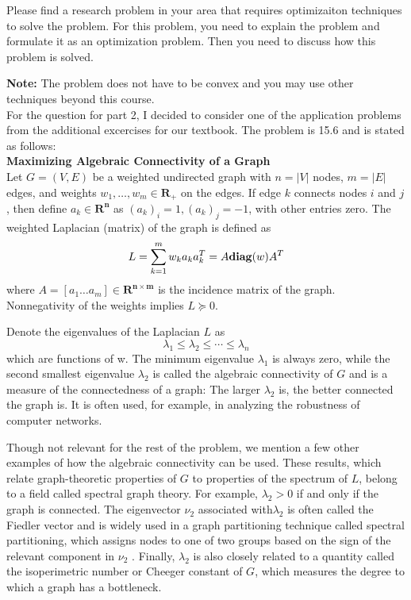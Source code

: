 Please find a research problem in your area that requires optimizaiton
techniques to solve the problem. For this problem, you need to explain
the problem and formulate it as an optimization problem. Then you need
to discuss how this problem is solved.

\textbf{Note:} The problem does not have to be convex and you may
use other techniques beyond this course.\\

For the question for part 2, I decided to consider one of the application problems
from the additional excercises for our textbook.  The problem is 15.6 and is stated
as follows:\\

\textbf{Maximizing Algebraic Connectivity of a Graph}\\

Let $G = (V, E)$ be a weighted undirected graph with $n = \vert V \vert$ nodes,
$m = \vert E \vert$ edges, and weights $w_{1}, \ldots, w_{m} \in \mathbf{R_{+}}$ on
the edges. If edge $k$ connects nodes $i$ and $j$, then define $a_{k} \in \mathbf{R^{n}}$
as $(a_{k})_{i} = 1, (a_{k})_{j} = -1$, with other entries zero.  The weighted Laplacian
(matrix) of the graph is defined as
\[
L = \sum_{k = 1}^{m} w_{k} a_{k} a_{k}^{T} = A \mbox{\textbf{diag}}(w)A^{T}
\]
where $A = [ a_{1} \ldots a_{m} ] \in \mathbf{R^{n \times m}}$ is the incidence matrix of the
graph. Nonnegativity of the weights implies $L \succeq 0$.

Denote the eigenvalues of the Laplacian $L$ as
\[
\lambda_{1} \leq \lambda_{2} \leq \cdots \leq \lambda_{n}
\]
which are functions of w. The minimum eigenvalue $\lambda_{1}$ is always zero, while the second smallest
eigenvalue $\lambda_{2}$ is called the algebraic connectivity of $G$ and is a measure of the connectedness of
a graph: The larger $\lambda_{2}$ is, the better connected the graph is. It is often used, for example, in
analyzing the robustness of computer networks.

Though not relevant for the rest of the problem, we mention a few other examples of how the
algebraic connectivity can be used. These results, which relate graph-theoretic properties of $G$
to properties of the spectrum of $L$, belong to a field called spectral graph theory. For example,
$\lambda_{2} > 0$ if and only if the graph is connected. The eigenvector $\nu_{2}$ associated with$\lambda_{2}$ is often called
the Fiedler vector and is widely used in a graph partitioning technique called spectral partitioning,
which assigns nodes to one of two groups based on the sign of the relevant component in $\nu_{2}$ . Finally,
$\lambda_{2}$ is also closely related to a quantity called the isoperimetric number or Cheeger constant of $G$,
which measures the degree to which a graph has a bottleneck.

